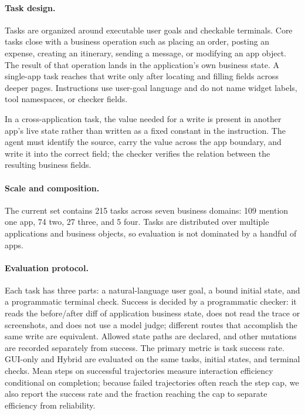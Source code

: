 \paragraph{Task design.}
Tasks are organized around executable user goals and checkable terminals. Core tasks close with a business operation such as placing an order, posting an expense, creating an itinerary, sending a message, or modifying an app object. The result of that operation lands in the application's own business state. A single-app task reaches that write only after locating and filling fields across deeper pages. Instructions use user-goal language and do not name widget labels, tool namespaces, or checker fields.

In a cross-application task, the value needed for a write is present in another app's live state rather than written as a fixed constant in the instruction. The agent must identify the source, carry the value across the app boundary, and write it into the correct field; the checker verifies the relation between the resulting business fields.

\paragraph{Scale and composition.}
The current set contains 215 tasks across seven business domains: 109 mention one app, 74 two, 27 three, and 5 four. Tasks are distributed over multiple applications and business objects, so evaluation is not dominated by a handful of apps.

\paragraph{Evaluation protocol.}
Each task has three parts: a natural-language user goal, a bound initial state, and a programmatic terminal check. Success is decided by a programmatic checker: it reads the before/after diff of application business state, does not read the trace or screenshots, and does not use a model judge; different routes that accomplish the same write are equivalent. Allowed state paths are declared, and other mutations are recorded separately from success. The primary metric is task success rate. GUI-only and Hybrid are evaluated on the same tasks, initial states, and terminal checks. Mean steps on successful trajectories measure interaction efficiency conditional on completion; because failed trajectories often reach the step cap, we also report the success rate and the fraction reaching the cap to separate efficiency from reliability.
